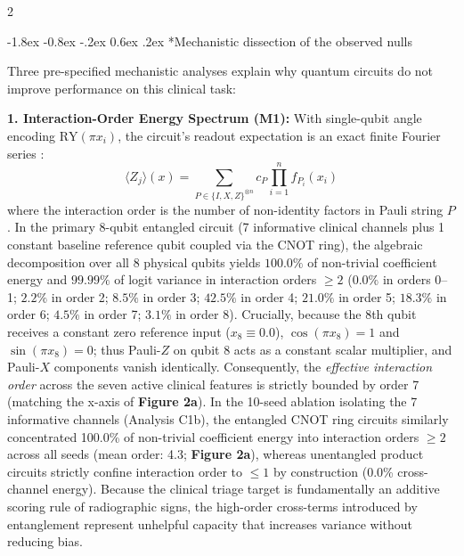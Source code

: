 \documentclass[10pt,a4paper,twoside]{article}
\makeatletter
\renewcommand{\subsection}{\@startsection{subsection}{2}{\z@}%
  {-1.8ex \@plus -0.8ex \@minus -.2ex}%
  {0.6ex \@plus.2ex}%
  {\normalfont\normalsize\sffamily\bfseries\color{naturedark}}}
\makeatother
\begin{document}
\begin{multicols}{2}

\subsection*{Mechanistic dissection of the observed nulls}

Three pre-specified mechanistic analyses explain why quantum circuits do not improve performance on this clinical task:

\textbf{1. Interaction-Order Energy Spectrum (M1):} With single-qubit angle encoding $\text{RY}(\pi x_i)$, the circuit's readout expectation is an exact finite Fourier series \cite{schuld2021effect}:
\begin{equation}
\langle Z_j \rangle(x) = \sum_{P \in \{I, X, Z\}^{\otimes n}} c_P \prod_{i=1}^n f_{P_i}(x_i)
\end{equation}
where the interaction order is the number of non-identity factors in Pauli string $P$. In the primary 8-qubit entangled circuit (7 informative clinical channels plus 1 constant baseline reference qubit coupled via the CNOT ring), the algebraic decomposition over all 8 physical qubits yields $100.0\%$ of non-trivial coefficient energy and $99.99\%$ of logit variance in interaction orders $\ge 2$ ($0.0\%$ in orders 0--1; $2.2\%$ in order 2; $8.5\%$ in order 3; $42.5\%$ in order 4; $21.0\%$ in order 5; $18.3\%$ in order 6; $4.5\%$ in order 7; $3.1\%$ in order 8). Crucially, because the 8th qubit receives a constant zero reference input ($x_8 \equiv 0.0$), $\cos(\pi x_8) = 1$ and $\sin(\pi x_8) = 0$; thus Pauli-$Z$ on qubit 8 acts as a constant scalar multiplier, and Pauli-$X$ components vanish identically. Consequently, the \textit{effective interaction order} across the seven active clinical features is strictly bounded by order 7 (matching the x-axis of \textbf{Figure 2a}). In the 10-seed ablation isolating the 7 informative channels (Analysis C1b), the entangled CNOT ring circuits similarly concentrated 100.0\% of non-trivial coefficient energy into interaction orders $\ge 2$ across all seeds (mean order: 4.3; \textbf{Figure 2a}), whereas unentangled product circuits strictly confine interaction order to $\le 1$ by construction (0.0\% cross-channel energy). Because the clinical triage target is fundamentally an additive scoring rule of radiographic signs, the high-order cross-terms introduced by entanglement represent unhelpful capacity that increases variance without reducing bias.


\end{multicols}
\end{document}
